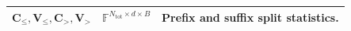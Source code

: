 \begin{table}[t]
\begin{tabular}{@{}p{}p{}p{}@{}}
        $\mathbf{C}_{\leq},\mathbf{V}_{\leq},\mathbf{C}_{>},\mathbf{V}_{>}$ & $\mathbb{F}^{N_{\mathrm{tot}}\times d\times B}$ & Prefix and suffix split statistics. \\
        \bottomrule
    \end{tabular}
\end{table}

